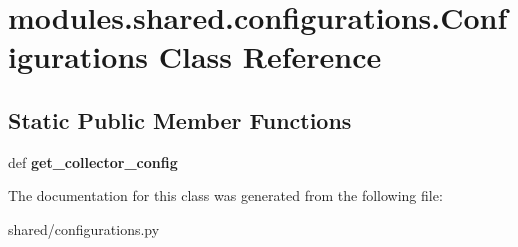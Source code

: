 \hypertarget{classmodules_1_1shared_1_1configurations_1_1_configurations}{}\section{modules.\+shared.\+configurations.\+Configurations Class Reference}
\label{classmodules_1_1shared_1_1configurations_1_1_configurations}
\subsection*{Static Public Member Functions}
\begin{DoxyCompactItemize}
\item 
\mbox{\label{classmodules_1_1shared_1_1configurations_1_1_configurations_a531dd249d19bef8981d0e4daf955e615}} 
def {\bfseries get\+\_\+collector\+\_\+config}
\end{DoxyCompactItemize}


The documentation for this class was generated from the following file\+:\begin{DoxyCompactItemize}
\item 
shared/configurations.\+py\end{DoxyCompactItemize}
